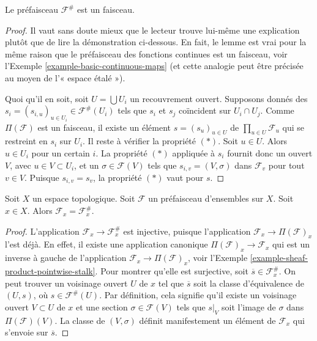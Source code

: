 \begin{lemma}
\label{lemma-sheafification-sheaf}
Le préfaisceau $\mathcal{F}^{\#}$ est un faisceau.
\end{lemma}

\begin{proof}
Il vaut sans doute mieux que le lecteur trouve lui-même une explication
plutôt que de lire la démonstration ci-dessous. En fait, le lemme est vrai
pour la même raison que le préfaisceau des fonctions
continues est un faisceau, voir l'Exemple \ref{example-basic-continuous-maps}
(et cette analogie peut être précisée au moyen de l'« espace \'etal\'e »).

\medskip\noindent
Quoi qu'il en soit, soit $U = \bigcup U_i$ un recouvrement ouvert.
Supposons donnés des $s_i = (s_{i, u})_{u \in U_i} \in \mathcal{F}^{\#}(U_i)$
tels que $s_i$ et $s_j$ coïncident sur $U_i \cap U_j$.
Comme $\Pi(\mathcal{F})$ est un faisceau,
il existe un élément $s = (s_u)_{u\in U}$ de $\prod_{u\in U} \mathcal{F}_u$
qui se restreint en $s_i$ sur $U_i$. Il reste à vérifier la propriété $(*)$.
Soit $u \in U$. Alors $u \in U_i$ pour un certain $i$. La propriété $(*)$ appliquée à $s_i$
fournit donc un ouvert $V$, avec $u \in V \subset U_i$,
et un $\sigma \in \mathcal{F}(V)$
tels que $s_{i, v} = (V, \sigma)$ dans $\mathcal{F}_v$
pour tout $v \in V$. Puisque $s_{i, v} = s_v$, la propriété $(*)$ vaut pour $s$.
\end{proof}

\begin{lemma}
\label{lemma-stalk-sheafification}
Soit $X$ un espace topologique.
Soit $\mathcal{F}$ un préfaisceau d'ensembles sur $X$.
Soit $x \in X$. Alors $\mathcal{F}_x = \mathcal{F}^\#_x$.
\end{lemma}

\begin{proof}
L'application $\mathcal{F}_x \to \mathcal{F}^\#_x$
est injective, puisque l'application
$\mathcal{F}_x \to \Pi(\mathcal{F})_x$ l'est déjà.
En effet, il existe une application canonique $\Pi(\mathcal{F})_x \to \mathcal{F}_x$
qui est un inverse à gauche de l'application $\mathcal{F}_x \to \Pi(\mathcal{F})_x$,
voir l'Exemple \ref{example-sheaf-product-pointwise-stalk}.
Pour montrer qu'elle est surjective, soit
$\overline{s} \in \mathcal{F}^\#_x$.
On peut trouver un voisinage ouvert $U$ de $x$ tel que
$\overline{s}$ soit la classe d'équivalence de $(U, s)$,
où $s \in \mathcal{F}^\#(U)$.
Par définition, cela signifie qu'il existe un voisinage ouvert
$V \subset U$ de $x$ et une section $\sigma \in \mathcal{F}(V)$
tels que $s|_V$ soit l'image de $\sigma$ dans $\Pi(\mathcal{F})(V)$.
La classe de $(V, \sigma)$ définit manifestement un élément de
$\mathcal{F}_x$ qui s'envoie sur $\overline{s}$.
\end{proof}

